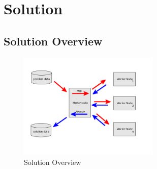 \section{Solution}
\lipsum[10-13]

\subsection{Solution Overview}
\lipsum[1]

\begin{figure}
  \centering
  \includegraphics[width=0.6\textwidth]{Images/overview.png}
  \caption{Solution Overview}
  \label{fig:Scheme}
\end{figure}
